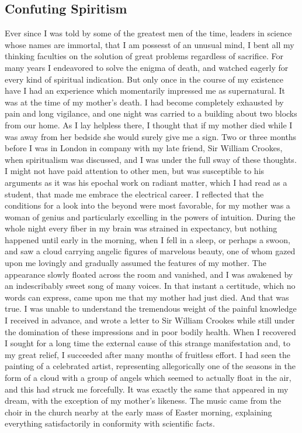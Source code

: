 \documentclass[a4paper,12pt,english,twoside,openright]{memoir}
\begin{document}
\subsection{Confuting Spiritism}
Ever since I was told by some of the greatest men of the time, leaders in science whose names 
are immortal, that I am possesst of an unusual mind, I bent all my thinking faculties on the 
solution of great problems regardless of sacrifice.  For many years I endeavored to solve the 
enigma of death, and watched eagerly for every kind of spiritual indication.  But only once in the 
course of my existence have I had an experience which momentarily impressed me as 
supernatural.  It was at the time of my mother's death.  I had become completely exhausted by 
pain and long vigilance, and one night was carried to a building about two blocks from our home.  
As I lay helpless there, I thought that if my mother died while I was away from her bedside she 
would surely give me a sign.  Two or three months before I was in London in company with my 
late friend, Sir William Crookes, when spiritualism was discussed, and I was under the full sway 
of these thoughts.  I might not have paid attention to other men, but was susceptible to his 
arguments as it was his epochal work on radiant matter, which I had read as a student, that made 
me embrace the electrical career.  I reflected that the conditions for a look into the beyond were 
most favorable, for my mother was a woman of genius and particularly excelling in the powers of 
intuition.  During the whole night every fiber in my brain was strained in expectancy, but nothing 
happened until early in the morning, when I fell in a sleep, or perhaps a swoon, and saw a cloud 
carrying angelic figures of marvelous beauty, one of whom gazed upon me lovingly and gradually 
assumed the features of my mother.  The appearance slowly floated across the room and 
vanished, and I was awakened by an indescribably sweet song of many voices.  In that instant a 
certitude, which no words can express, came upon me that my mother had just died.  And that 
was true.  I was unable to understand the tremendous weight of the painful knowledge I received 
in advance, and wrote a letter to Sir William Crookes while still under the domination of these 
impressions and in poor bodily health.  When I recovered I sought for a long time the external 
cause of this strange manifestation and, to my great relief, I succeeded after many months of 
fruitless effort.  I had seen the painting of a celebrated artist, representing allegorically one of the 
seasons in the form of a cloud with a group of angels which seemed to actually float in the air, 
and this had struck me forcefully.  It was exactly the same that appeared in my dream, with the 
exception of my mother's likeness.  The music came from the choir in the church nearby at the 
early mass of Easter morning, explaining everything satisfactorily in conformity with scientific 
facts.  
\end{document}
